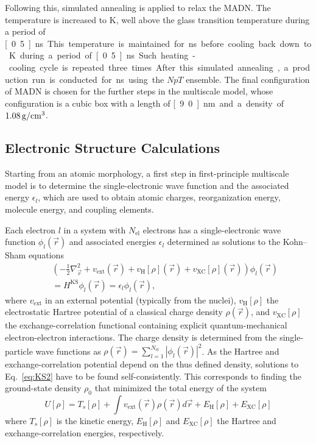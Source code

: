 \documentclass[%
 reprint,
superscriptaddress,
 amsmath,amssymb,
 aps,
prb,
floatfix
]{revtex4-2}
\begin{document}
Following this, simulated annealing is applied to relax the MADN.  
The temperature is increased to \unit[800]{K}, well above the glass transition temperature during a period of \unit[0.5]{ns}. 
This temperature is maintained for \unit[1]{ns} before cooling back down to \unit[300]{K} during a period of \unit[0.5]{ns}.
Such heating-cooling cycle is repeated three times. After this simulated annealing, a production run is conducted for \unit[2]{ns} using the $NpT$ ensemble. The final configuration of MADN is chosen for the further steps in the multiscale model, whose configuration is a cubic box with a length of \unit[9.0]{nm} and a density of $\unit[1.08]{g/cm^3}$. 

\subsection{Electronic Structure Calculations} 
\label{sec:es}
Starting from an atomic morphology, a first step in first-principle multiscale model is to determine the single-electronic wave function and the associated energy $\epsilon_l$, which are used to obtain atomic charges, reorganization energy, molecule energy, and coupling elements.

Each electron $l$ in a system with $N_\text{el}$ electrons has a single-electronic wave function $\phi_l (\vec{r})$ and associated energies $\epsilon_l$ determined as solutions to the Kohn--Sham equations~\cite{kohn_self_1965}
%
\begin{eqnarray}
    && \left(-\frac{1}{2}\nabla^2_{\vec{r}} + v_\text{ext}(\vec{r}) + v_\text{H}[\rho](\vec{r}) + v_\text{XC}[\rho](\vec{r})\right) \phi_l(\vec{r}) \nonumber \\
    && = H^\text{KS} \phi_l(\vec{r}) = \epsilon_l \phi_l (\vec{r}) ,
    \label{eq:KS2}
\end{eqnarray}
%
where $v_\text{ext}$ in an external potential (typically from the nuclei), $v_\text{H}[\rho]$ the electrostatic Hartree potential of a classical charge density $\rho(\vec{r})$, and $v_\text{XC}[\rho]$ the exchange-correlation functional containing explicit quantum-mechanical electron-electron interactions. The charge density is determined from the single-particle wave functions as $\rho(\vec{r})=\sum\limits_{l=1}^{N_\text{el}} \left\vert\phi_l(\vec{r})\right\vert^2$. As the Hartree and exchange-correlation potential depend on the thus defined density, solutions to Eq.~\ref{eq:KS2} have to be found self-consistently. This corresponds to finding the ground-state density $\rho_0$ that minimized the total energy of the system
%
\begin{equation}
    U[\rho] = T_s[\rho] + \int v_\text{ext}(\vec{r}) \rho(\vec{r}) d \vec{r} + E_\text{H}[\rho] + E_\text{XC}[\rho]
    \label{eq:KS_model}
\end{equation}
%
where $T_s[\rho]$ is the kinetic energy, $E_\text{H}[\rho]$ and $E_\text{XC}[\rho]$ the Hartree and exchange-correlation energies, respectively. 
\end{document}
